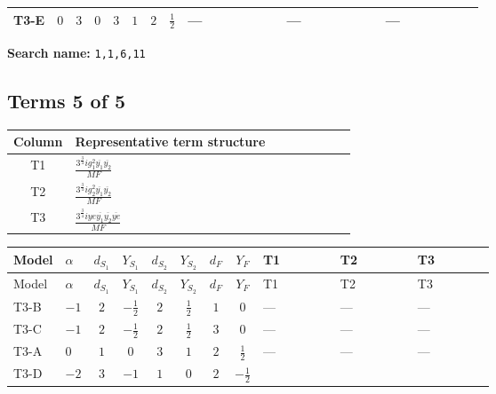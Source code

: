 \documentclass[8pt]{article}
\begin{document}
\begin{landscape}
\begin{longtable}{@{}llcccccc >{\raggedright\arraybackslash}p{0.21\linewidth} >{\raggedright\arraybackslash}p{0.21\linewidth} >{\raggedright\arraybackslash}p{0.21\linewidth}@{}}
\midrule
T3-E & $0$ & $3$ & $0$ & $3$ & $1$ & $2$ & $\frac{1}{2}$ & --- & --- & --- \\
\midrule
\bottomrule
\end{longtable}
\clearpage
\noindent\textbf{Search name: }\texttt{1,1,6,11}\par\smallskip
\subsection*{Terms 5 of 5}
\begin{center}
\begin{tabular}{@{}c >{\raggedright\arraybackslash}p{0.82\linewidth}@{}}
\toprule
Column & Representative term structure \\
\midrule
T1 & \(\displaystyle \frac{3^{\frac{3}{4}} i g_{1}^{2} \overline{y_{1}} \overline{y_{2}}}{MF}\) \\
\midrule
T2 & \(\displaystyle \frac{3^{\frac{3}{4}} i g_{2}^{2} \overline{y_{1}} \overline{y_{2}}}{MF}\) \\
\midrule
T3 & \(\displaystyle \frac{3^{\frac{3}{4}} i ye \overline{y_{1}} \overline{y_{2}} \overline{ye}}{MF}\) \\
\midrule
\bottomrule
\end{tabular}
\end{center}
\smallskip
\tiny
\begin{longtable}{@{}llcccccc >{\raggedright\arraybackslash}p{0.21\linewidth} >{\raggedright\arraybackslash}p{0.21\linewidth} >{\raggedright\arraybackslash}p{0.21\linewidth}@{}}
\toprule
Model & $\alpha$ & $d_{S_1}$ & $Y_{S_1}$ & $d_{S_2}$ & $Y_{S_2}$ & $d_F$ & $Y_F$ & T1 & T2 & T3 \\
\midrule
\endfirsthead
\toprule
Model & $\alpha$ & $d_{S_1}$ & $Y_{S_1}$ & $d_{S_2}$ & $Y_{S_2}$ & $d_F$ & $Y_F$ & T1 & T2 & T3 \\
\midrule
\endhead
T3-B & $-1$ & $2$ & $-\frac{1}{2}$ & $2$ & $\frac{1}{2}$ & $1$ & $0$ & --- & --- & --- \\
\midrule
T3-C & $-1$ & $2$ & $-\frac{1}{2}$ & $2$ & $\frac{1}{2}$ & $3$ & $0$ & --- & --- & --- \\
\midrule
T3-A & $0$ & $1$ & $0$ & $3$ & $1$ & $2$ & $\frac{1}{2}$ & --- & --- & --- \\
\midrule
T3-D & $-2$ & $3$ & $-1$ & $1$ & $0$ & $2$ & $-\frac{1}{2}$ & \scriptsize\adjustbox{max width=\linewidth}{$\begin{gathered} \frac{3^{\frac{3}{4}} i g_{1}^{2} \overline{y_{1}} \overline{y_{2}}}{8 MF}\end{gathered}$} & \scriptsize\adjustbox{max width=\linewidth}{$\begin{gathered} \frac{17 \cdot 3^{\frac{3}{4}} i g_{2}^{2} \overline{y_{1}} \overline{y_{2}}}{24 MF}\end{gathered}$} & \scriptsize\adjustbox{max width=\linewidth}{$\begin{gathered} - \frac{3^{\frac{3}{4}} i ye \overline{y_{1}} \overline{y_{2}} \overline{ye}}{12 MF}\end{gathered}$} \\

\end{longtable}
\end{landscape}
\end{document}
